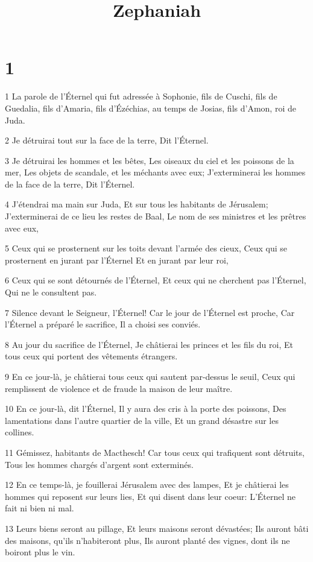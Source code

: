 

\title{Zephaniah}


\chapter{1}

\par 1 La parole de l'Éternel qui fut adressée à Sophonie, fils de Cuschi, fils de Guedalia, fils d'Amaria, fils d'Ézéchias, au temps de Josias, fils d'Amon, roi de Juda.
\par 2 Je détruirai tout sur la face de la terre, Dit l'Éternel.
\par 3 Je détruirai les hommes et les bêtes, Les oiseaux du ciel et les poissons de la mer, Les objets de scandale, et les méchants avec eux; J'exterminerai les hommes de la face de la terre, Dit l'Éternel.
\par 4 J'étendrai ma main sur Juda, Et sur tous les habitants de Jérusalem; J'exterminerai de ce lieu les restes de Baal, Le nom de ses ministres et les prêtres avec eux,
\par 5 Ceux qui se prosternent sur les toits devant l'armée des cieux, Ceux qui se prosternent en jurant par l'Éternel Et en jurant par leur roi,
\par 6 Ceux qui se sont détournés de l'Éternel, Et ceux qui ne cherchent pas l'Éternel, Qui ne le consultent pas.
\par 7 Silence devant le Seigneur, l'Éternel! Car le jour de l'Éternel est proche, Car l'Éternel a préparé le sacrifice, Il a choisi ses conviés.
\par 8 Au jour du sacrifice de l'Éternel, Je châtierai les princes et les fils du roi, Et tous ceux qui portent des vêtements étrangers.
\par 9 En ce jour-là, je châtierai tous ceux qui sautent par-dessus le seuil, Ceux qui remplissent de violence et de fraude la maison de leur maître.
\par 10 En ce jour-là, dit l'Éternel, Il y aura des cris à la porte des poissons, Des lamentations dans l'autre quartier de la ville, Et un grand désastre sur les collines.
\par 11 Gémissez, habitants de Macthesch! Car tous ceux qui trafiquent sont détruits, Tous les hommes chargés d'argent sont exterminés.
\par 12 En ce temps-là, je fouillerai Jérusalem avec des lampes, Et je châtierai les hommes qui reposent sur leurs lies, Et qui disent dans leur coeur: L'Éternel ne fait ni bien ni mal.
\par 13 Leurs biens seront au pillage, Et leurs maisons seront dévastées; Ils auront bâti des maisons, qu'ils n'habiteront plus, Ils auront planté des vignes, dont ils ne boiront plus le vin.

